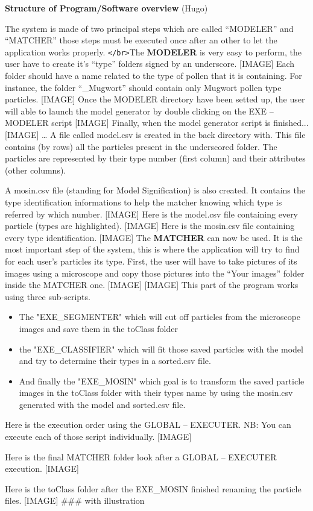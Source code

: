 \textbf{Structure of Program/Software overview} (Hugo) 

The system is made of two principal steps which are called “MODELER” and “MATCHER” those steps must be executed once after an other to let the application works properly.
\verb|</br>|The \textbf{MODELER} is very easy to perform, the user have to create it's “type” folders signed by an underscore.
[IMAGE]
Each folder should have a name related to the type of pollen that it is containing. For instance, the folder “_Mugwort” should contain only Mugwort pollen type particles.
[IMAGE]
Once the MODELER directory have been setted up, the user will able to launch the model generator by double clicking on the EXE – MODELER script
[IMAGE]
Finally, when the model generator script is finished...
[IMAGE]
… A file called model.csv is created in the back directory with. This file contains (by rows) all the particles present in the underscored folder. The particles are represented by their type number (first column) and their attributes (other columns).

A mosin.csv file (standing for Model Signification) is also created. It contains the type identification informations to help the matcher knowing which type is referred by which number.
[IMAGE]
Here is the model.csv file containing every particle (types are highlighted).
[IMAGE]
Here is the mosin.csv file containing every type identification.
[IMAGE]
The \textbf{MATCHER} can now be used. It is the most important step of the system, this is where the application will try to find for each user's particles its type.
First, the user will have to take pictures of its images using a microscope and copy those pictures into the “Your images” folder inside the MATCHER one.
[IMAGE]
[IMAGE]
This part of the program works using three sub-scripts.

\begin{itemize}
\item The "EXE_SEGMENTER" which will cut off particles from the microscope images and save them in the toClass folder

\item the "EXE_CLASSIFIER" which will fit those saved particles with the model and try to determine their types in a sorted.csv file.

\item And finally the "EXE_MOSIN" which goal is to transform the saved particle images in the toClass folder with their types name by using the mosin.csv generated with the model and sorted.csv file.
\end{itemize}

Here is the execution order using the GLOBAL – EXECUTER.
NB: You can execute each of those script individually.
[IMAGE]

Here is the final MATCHER folder look after a GLOBAL – EXECUTER execution.
[IMAGE]

Here is the toClass folder after the EXE_MOSIN finished renaming the particle files.
[IMAGE]
### with illustration
    
    
    
    
    
    